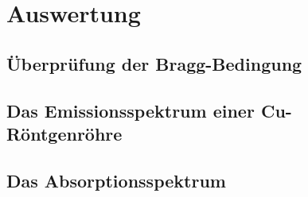 \section{Auswertung}
\label{sec:Auswertung}

\subsection{Überprüfung der Bragg-Bedingung}

\subsection{Das Emissionsspektrum einer Cu-Röntgenröhre}


\subsection{Das Absorptionsspektrum}